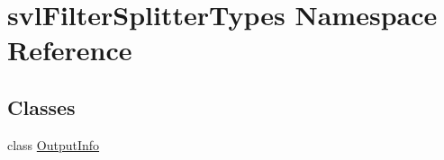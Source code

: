 \hypertarget{namespacesvl_filter_splitter_types}{}\section{svl\+Filter\+Splitter\+Types Namespace Reference}
\label{namespacesvl_filter_splitter_types}
\subsection*{Classes}
\begin{DoxyCompactItemize}
\item 
class \hyperlink{classsvl_filter_splitter_types_1_1_output_info}{Output\+Info}
\end{DoxyCompactItemize}
